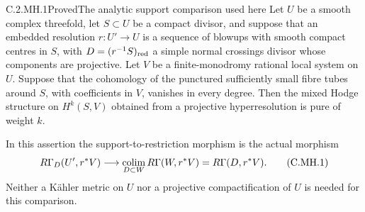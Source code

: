 \begin{statement}{C.2.MH.1}{Proved}{The analytic support comparison used here}
Let $U$ be a smooth complex threefold, let $S\subset U$ be a
compact divisor, and suppose that an embedded resolution
$r:U'\to U$ is a sequence of blowups with smooth compact
centres in $S$, with $D=(r^{-1}S)_{\rm red}$ a simple
normal crossings divisor whose components are projective.
Let $V$ be a finite-monodromy rational local system on $U$.
Suppose that the cohomology of the punctured sufficiently
small fibre tubes around $S$, with coefficients in $V$,
vanishes in every degree. Then the mixed Hodge structure
on $H^k(S,V)$ obtained from a projective hyperresolution
is pure of weight $k$.

In this assertion the support-to-restriction morphism is
the actual morphism
\[
 R\Gamma_D(U',r^*V)\longrightarrow
 \underset{D\subset W}{\mathop{\rm colim}}\,
 R\Gamma(W,r^*V)=R\Gamma(D,r^*V).
 \tag{C.MH.1}
\]
Neither a K\"ahler metric on $U$ nor a projective
compactification of $U$ is needed for this comparison.
\end{statement}
